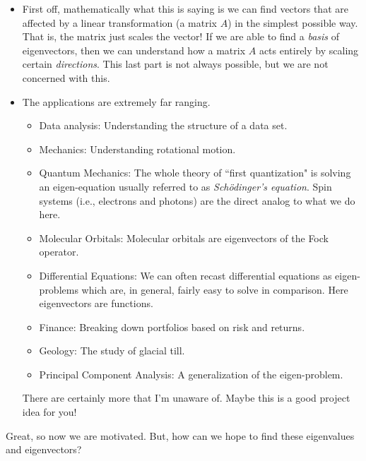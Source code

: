         \begin{answer}
        \begin{itemize}
            \item First off, mathematically what this is saying is we can find vectors that are affected by a linear transformation (a matrix $A$) in the simplest possible way.  That is, the matrix just scales the vector!  If we are able to find a \emph{basis} of eigenvectors, then we can understand how a matrix $A$ acts entirely by scaling certain \emph{directions}. This last part is not always possible, but we are not concerned with this.
            \item The applications are extremely far ranging.  
            \begin{itemize}
                \item Data analysis: Understanding the structure of a data set.
                \item Mechanics: Understanding rotational motion.
                \item Quantum Mechanics: The whole theory of ``first quantization" is solving an eigen-equation usually referred to as \emph{Sch\"odinger's equation}. Spin systems (i.e., electrons and photons) are the direct analog to what we do here.
                \item Molecular Orbitals: Molecular orbitals are eigenvectors of the Fock operator.
                \item Differential Equations: We can often recast differential equations as eigen-problems which are, in general, fairly easy to solve in comparison. Here eigenvectors are functions.
                \item Finance: Breaking down portfolios based on risk and returns.
                \item Geology: The study of glacial till.
                \item Principal Component Analysis: A generalization of the eigen-problem.
            \end{itemize}
            There are certainly more that I'm unaware of.  Maybe this is a good project idea for you!
        \end{itemize}
        \end{answer}
        
        Great, so now we are motivated.  But, how can we hope to find these eigenvalues and eigenvectors?  
        
